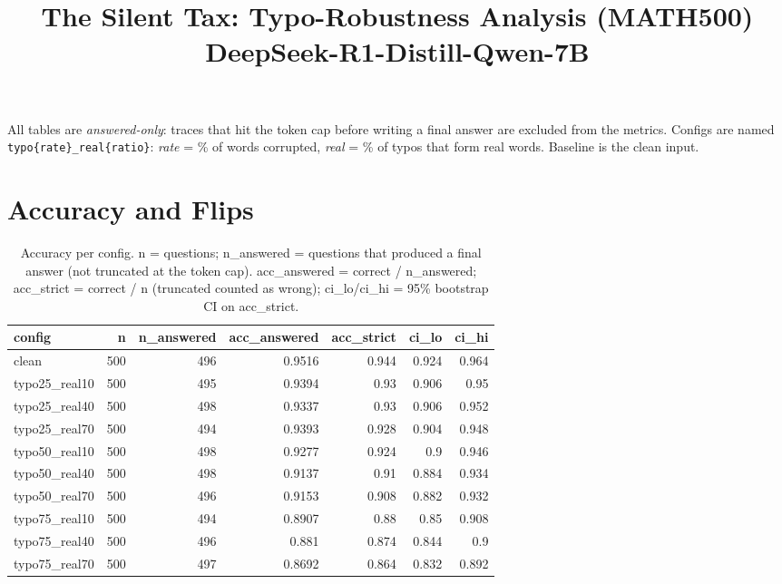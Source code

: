 \documentclass[11pt]{article}
\title{The Silent Tax: Typo-Robustness Analysis (MATH500)\\\large DeepSeek-R1-Distill-Qwen-7B}
\date{}
\begin{document}
\maketitle
\noindent All tables are \emph{answered-only}: traces that hit the token cap before writing a final answer are excluded from the metrics. Configs are named \texttt{typo\{rate\}\_real\{ratio\}}: \emph{rate} = \% of words corrupted, \emph{real} = \% of typos that form real words. Baseline is the clean input.

\section*{Accuracy and Flips}
\begin{table}[H]
\centering
\caption{Accuracy per config. n = questions; n\_answered = questions that produced a final answer (not truncated at the token cap). acc\_answered = correct / n\_answered; acc\_strict = correct / n (truncated counted as wrong); ci\_lo/ci\_hi = 95\% bootstrap CI on acc\_strict.}
\small
\begin{adjustbox}{max width=\textwidth}
\begin{tabular}{lrrrrrr}
\toprule
\textbf{config} & \textbf{n} & \textbf{n\_answered} & \textbf{acc\_answered} & \textbf{acc\_strict} & \textbf{ci\_lo} & \textbf{ci\_hi} \\
\midrule
clean & 500 & 496 & 0.9516 & 0.944 & 0.924 & 0.964 \\
typo25\_real10 & 500 & 495 & 0.9394 & 0.93 & 0.906 & 0.95 \\
typo25\_real40 & 500 & 498 & 0.9337 & 0.93 & 0.906 & 0.952 \\
typo25\_real70 & 500 & 494 & 0.9393 & 0.928 & 0.904 & 0.948 \\
typo50\_real10 & 500 & 498 & 0.9277 & 0.924 & 0.9 & 0.946 \\
typo50\_real40 & 500 & 498 & 0.9137 & 0.91 & 0.884 & 0.934 \\
typo50\_real70 & 500 & 496 & 0.9153 & 0.908 & 0.882 & 0.932 \\
typo75\_real10 & 500 & 494 & 0.8907 & 0.88 & 0.85 & 0.908 \\
typo75\_real40 & 500 & 496 & 0.881 & 0.874 & 0.844 & 0.9 \\
typo75\_real70 & 500 & 497 & 0.8692 & 0.864 & 0.832 & 0.892 \\
\bottomrule
\end{tabular}
\end{adjustbox}
\end{table}
\end{document}
